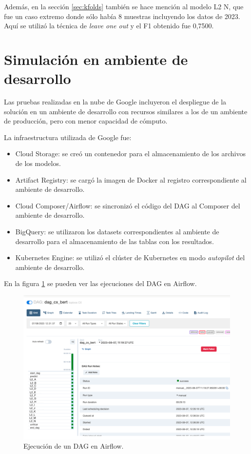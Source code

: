 Además, en la sección \ref{sec:kfolds} también se hace mención al modelo L2 N, que fue un caso extremo donde sólo había 8 muestras incluyendo los datos de 2023. Aquí se utilizó la técnica de \textit{leave one out} y el F1 obtenido fue 0,7500.

\section{Simulación en ambiente de desarrollo}

Las pruebas realizadas en la nube de Google incluyeron el despliegue de la solución en un ambiente de desarrollo con recursos similares a los de un ambiente de producción, pero con menor capacidad de cómputo.

La infraestructura utilizada de Google fue:
\begin{itemize}
	\item Cloud Storage: se creó un contenedor para el almacenamiento de los archivos de los modelos.
	\item Artifact Registry: se cargó la imagen de Docker al registro correspondiente al ambiente de desarrollo.
	\item Cloud Composer/Airflow: se sincronizó el código del DAG al Composer del ambiente de desarrollo.
	\item BigQuery: se utilizaron los datasets correspondientes al ambiente de desarrollo para el almacenamiento de las tablas con los resultados.
	\item Kubernetes Engine: se utilizó el clúster de Kubernetes en modo \textit{autopilot} del ambiente de desarrollo.
\end{itemize}

En la figura \ref{fig:cap4-dag} se pueden ver las ejecuciones del DAG en Airflow.

\begin{figure}[htbp]
	\centering
	\includegraphics[width=1\textwidth]{./Figures/cap4-dag.png}
	\caption{Ejecución de un DAG en Airflow.}
	\label{fig:cap4-dag}
\end{figure}

